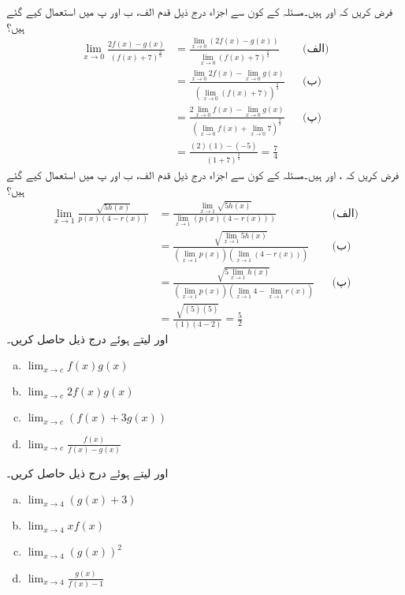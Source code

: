 فرض کریں کہ  اور  ہیں۔مسئلہ  کے کون سے اجزاء درج ذیل قدم الف، ب اور پ میں استعمال کیے گئے ہیں؟
\begin{align*}
\lim_{x\to 0}\frac{2f(x)-g(x)}{(f(x)+7)^{\tfrac{2}{3}}}&=\frac{\lim_{x\to 0}(2f(x)-g(x))}{\lim_{x\to 0}(f(x)+7)^{\tfrac{2}{3}}}&& \text{(الف)}\\
&=\frac{\lim_{x\to 0} 2f(x)-\lim_{x\to 0} g(x)}{(\lim_{x\to 0} (f(x)+7))^{\tfrac{2}{3}}}&&\text{(ب)}\\
&=\frac{2\lim_{x\to 0} f(x)-\lim_{x\to 0} g(x)}{(\lim_{x\to 0} f(x)+\lim_{x\to 0} 7)^{\tfrac{2}{3}}}&&\text{(پ)}\\
&=\frac{(2)(1)-(-5)}{(1+7)^{\tfrac{2}{3}}}=\frac{7}{4}
\end{align*}
فرض کریں کہ ،  اور  ہیں۔مسئلہ  کے کون سے اجزاء درج ذیل قدم الف، ب اور پ میں استعمال کیے گئے ہیں؟
\begin{align*}
\lim_{x\to 1}\frac{\sqrt{5h(x)}}{p(x)(4-r(x))}&=\frac{\lim_{x\to 1} \sqrt{5h(x)}}{\lim_{x\to 1}(p(x)(4-r(x)))}&&\text{(الف)}\\
&=\frac{\sqrt{\lim_{x\to 1} 5h(x)}}{(\lim_{x\to 1} p(x))(\lim_{x\to 1}(4-r(x)))}&&\text{(ب)}\\
&=\frac{\sqrt{5\lim_{x\to 1}h(x)}}{(\lim_{x\to 1} p(x))(\lim_{x\to 1}4-\lim_{x\to 1} r(x))}&&\text{(پ)}\\
&=\frac{\sqrt{(5)(5)}}{(1)(4-2)}=\frac{5}{2}
\end{align*}
 اور  لیتے ہوئے درج ذیل حاصل کریں۔
\begin{multicols}{2}
\begin{enumerate}[a.]
\item
$\lim_{x\to c} f(x)g(x)$
\item
$\lim_{x\to c} 2f(x)g(x)$
\item
$\lim_{x\to c} (f(x)+3g(x))$
\item
$\lim_{x\to c}\tfrac{f(x)}{f(x)-g(x)}$
\end{enumerate}
\end{multicols}
 اور  لیتے ہوئے درج ذیل حاصل کریں۔
\begin{multicols}{2}
\begin{enumerate}[a.]
\item
$\lim_{x\to 4} (g(x)+3)$
\item
$\lim_{x\to 4} xf(x)$
\item
$\lim_{x\to 4} (g(x))^2$
\item
$\lim_{x\to 4} \tfrac{g(x)}{f(x)-1}$
\end{enumerate}
\end{multicols}

